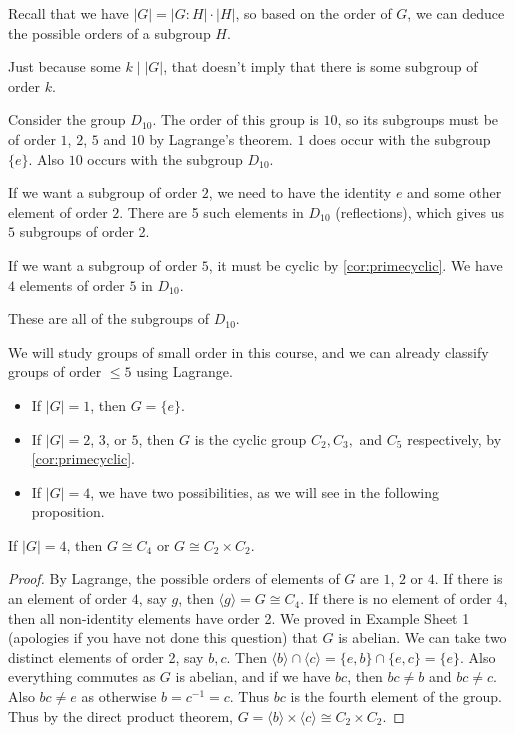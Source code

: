 
Recall that we have $|G| = |G:H| \cdot |H|$, so based on the order of $G$, we can deduce the possible orders of a subgroup $H$.

\begin{remark}
	Just because some $k \mid |G|$, that doesn't imply that there is some subgroup of order $k$.
\end{remark}

\begin{example}[Subgroups of $D_{10}$]
	Consider the group $D_{10}$. The order of this group is $10$, so its subgroups must be of order $1$, $2$, $5$ and $10$ by Lagrange's theorem.
	$1$ does occur with the subgroup $\{e\}$. Also $10$ occurs with the subgroup $D_{10}$.

	If we want a subgroup of order $2$, we need to have the identity $e$ and some other element of order $2$. There are 5 such elements in $D_{10}$ (reflections), which gives us $5$ subgroups of order 2.

	If we want a subgroup of order $5$, it must be cyclic by \autoref{cor:primecyclic}. We have $4$ elements of order $5$ in $D_{10}$.

	These are all of the subgroups of $D_{10}$.
\end{example}

We will study groups of small order in this course, and we can already classify groups of order $\leq 5$ using Lagrange.

\begin{itemize}
	\item If $|G| = 1$, then $G = \{e\}$.
	\item If $|G| = 2$, $3$, or $5$, then $G$ is the cyclic group $C_2, C_3,$ and $C_5$ respectively, by \autoref{cor:primecyclic}.
	\item If $|G| = 4$, we have two possibilities, as we will see in the following proposition.
\end{itemize}

\begin{proposition}
	If $|G| = 4$, then $G \cong C_4$ or $G \cong C_2 \times C_2$.
\end{proposition}
\begin{proof}
	By Lagrange, the possible orders of elements of $G$ are $1$, $2$ or $4$. If there is an element of order $4$, say $g$, then $\langle g \rangle = G \cong C_4$. If there is no element of order 4, then all non-identity elements have order 2. We proved in Example Sheet 1 (apologies if you have not done this question) that $G$ is abelian. We can take two distinct elements of order 2, say $b, c$. Then $\langle b \rangle \cap \langle c \rangle = \{e, b\} \cap \{e, c\} = \{e\}$. Also everything commutes as $G$ is abelian, and if we have $bc$, then $bc \neq b$ and $bc \neq c$. Also $bc \neq e$ as otherwise $b = c^{-1} = c$. Thus $bc$ is the fourth element of the group. Thus by the direct product theorem, $G = \langle b \rangle \times \langle c \rangle \cong C_2 \times C_2$.
\end{proof}

